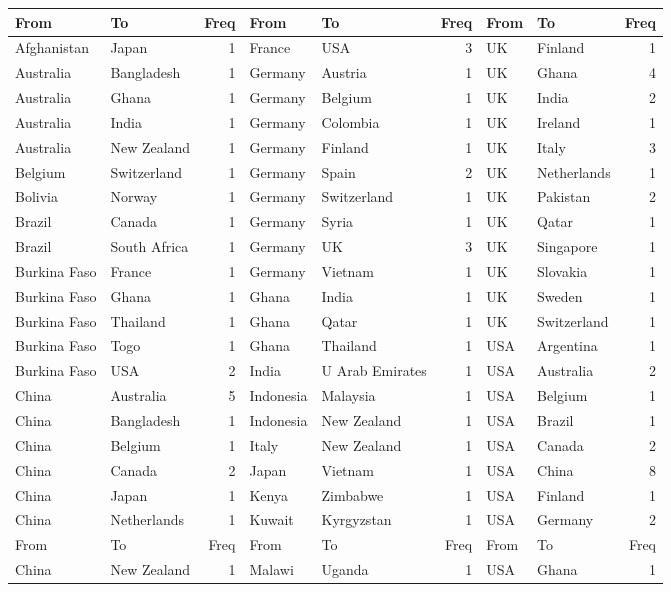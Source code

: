 
\begin{table}[ht]
\centering
\footnotesize
\begin{tabular}{llr|llr|llr} 
\toprule
From & To & Freq & From & To & Freq & From & To & Freq\\
 \hline
\addlinespace
Afghanistan & Japan & 1 & France & USA & 3 & UK & Finland & 1\\
Australia & Bangladesh & 1 & Germany & Austria & 1 & UK & Ghana & 4\\
Australia & Ghana & 1 & Germany & Belgium & 1 & UK & India & 2\\
Australia & India & 1 & Germany & Colombia & 1 & UK & Ireland & 1\\
Australia & New Zealand & 1 & Germany & Finland & 1 & UK & Italy & 3\\
Belgium & Switzerland & 1 & Germany & Spain & 2 & UK & Netherlands & 1\\
Bolivia & Norway & 1 & Germany & Switzerland & 1 & UK & Pakistan & 2\\
Brazil & Canada & 1 & Germany & Syria & 1 & UK & Qatar & 1\\
Brazil & South Africa & 1 & Germany & UK & 3 & UK & Singapore & 1\\
Burkina Faso & France & 1 & Germany & Vietnam & 1 & UK & Slovakia & 1\\ 
Burkina Faso & Ghana & 1 & Ghana & India & 1 & UK & Sweden & 1\\
Burkina Faso & Thailand & 1 & Ghana & Qatar & 1 & UK & Switzerland & 1\\
Burkina Faso & Togo & 1 & Ghana & Thailand & 1 & USA & Argentina & 1\\ 
Burkina Faso & USA & 2 & India & U Arab Emirates & 1 & USA & Australia & 2\\ 
China & Australia & 5 & Indonesia & Malaysia & 1 & USA & Belgium & 1\\
China & Bangladesh & 1 & Indonesia & New Zealand & 1 & USA & Brazil & 1\\
China & Belgium & 1 & Italy & New Zealand & 1 & USA & Canada & 2\\ 
China & Canada & 2 & Japan & Vietnam & 1 & USA & China & 8\\
China & Japan & 1 & Kenya & Zimbabwe & 1 & USA & Finland & 1\\
China & Netherlands & 1 & Kuwait & Kyrgyzstan & 1 & USA & Germany & 2\\
\toprule
From & To & Freq & From & To & Freq & From & To & Freq\\
\hline
\addlinespace 
China & New Zealand & 1 & Malawi & Uganda & 1 & USA & Ghana & 1\\

\end{tabular}
\end{table}
